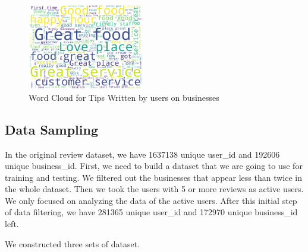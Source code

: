 \documentclass[journal]{IEEEtran}
\begin{document}
\begin{figure}
\begin {center}
\includegraphics[width=0.45\textwidth]{images/tip_wordcloud.png}
\caption{Word Cloud for Tips Written by users on businesses}
\label{fig:tip_wordcloud}
\end {center}
\end{figure}

\subsection{Data Sampling}

In the original review dataset, we have 1637138 unique user\_id and 192606 unique business\_id. First, we need to build a dataset that we are going to use for training and testing. We filtered out the businesses that appear less than twice in the whole dataset. Then we  took the users with 5 or more reviews as active users. We only focused on analyzing the data of the active users. After this initial step of data filtering, we have 281365 unique user\_id and 172970 unique business\_id left.

We constructed three sets of dataset.
\end{document}
